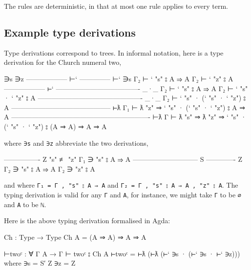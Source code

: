 The rules are deterministic, in that at most one rule applies to every
term.

\hypertarget{Lambda-derivation}{%
\subsection{Example type derivations}\label{Lambda-derivation}}

Type derivations correspond to trees. In informal notation, here is a
type derivation for the Church numeral two,

\begin{myDisplay}
                        ∋s                     ∋z
                        ------------------ ⊢`  -------------- ⊢`
∋s                      Γ₂ ⊢ ` "s" ⦂ A ⇒ A     Γ₂ ⊢ ` "z" ⦂ A
------------------ ⊢`   ------------------------------------- _·_
Γ₂ ⊢ ` "s" ⦂ A ⇒ A      Γ₂ ⊢ ` "s" · ` "z" ⦂ A
---------------------------------------------- _·_
Γ₂ ⊢ ` "s" · (` "s" · ` "z") ⦂ A
-------------------------------------------- ⊢ƛ
Γ₁ ⊢ ƛ "z" ⇒ ` "s" · (` "s" · ` "z") ⦂ A ⇒ A
------------------------------------------------------------- ⊢ƛ
Γ ⊢ ƛ "s" ⇒ ƛ "z" ⇒ ` "s" · (` "s" · ` "z") ⦂ (A ⇒ A) ⇒ A ⇒ A
\end{myDisplay}

where \texttt{∋s} and \texttt{∋z} abbreviate the two derivations,

\begin{myDisplay}
             ---------------- Z
"s" ≢ "z"    Γ₁ ∋ "s" ⦂ A ⇒ A
----------------------------- S       ------------- Z
Γ₂ ∋ "s" ⦂ A ⇒ A                       Γ₂ ∋ "z" ⦂ A
\end{myDisplay}

and where \texttt{Γ₁\ =\ Γ\ ,\ "s"\ ⦂\ A\ ⇒\ A} and
\texttt{Γ₂\ =\ Γ\ ,\ "s"\ ⦂\ A\ ⇒\ A\ ,\ "z"\ ⦂\ A}. The typing
derivation is valid for any \texttt{Γ} and \texttt{A}, for instance, we
might take \texttt{Γ} to be \texttt{∅} and \texttt{A} to be
\texttt{\textasciigrave{}ℕ}.

Here is the above typing derivation formalised in Agda:

\begin{fence}
\begin{code}
Ch : Type → Type
Ch A = (A ⇒ A) ⇒ A ⇒ A

⊢twoᶜ : ∀ {Γ A} → Γ ⊢ twoᶜ ⦂ Ch A
⊢twoᶜ = ⊢ƛ (⊢ƛ (⊢` ∋s · (⊢` ∋s · ⊢` ∋z)))
  where
  ∋s = S′ Z
  ∋z = Z
\end{code}
\end{fence}

